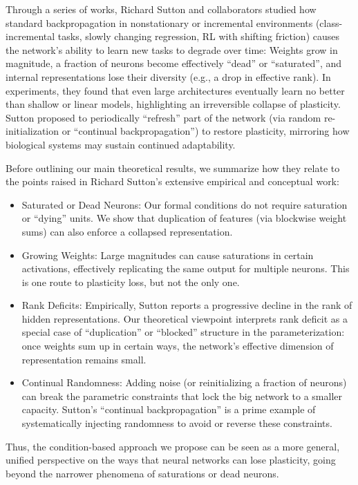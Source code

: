 \documentclass[11pt]{article}
\begin{document}
Through a series of works, Richard Sutton and collaborators studied how standard backpropagation in nonstationary or incremental environments (class-incremental tasks, slowly changing regression, RL with shifting friction) causes the network's ability to learn new tasks to degrade over time: Weights grow in magnitude, a fraction of neurons become effectively ``dead'' or ``saturated'', and internal representations lose their diversity (e.g., a drop in effective rank).
In experiments, they found that even large architectures eventually learn no better than shallow or linear models, highlighting an irreversible collapse of plasticity. Sutton proposed to periodically ``refresh'' part of the network (via random re-initialization or ``continual backpropagation'') to restore plasticity, mirroring how biological systems may sustain continued adaptability.

Before outlining our main theoretical results, we summarize how they relate to the points raised in Richard Sutton's extensive empirical and conceptual work:
\begin{itemize}
    \item Saturated or Dead Neurons: Our formal conditions do not require saturation or ``dying'' units. We show that duplication of features (via blockwise weight sums) can also enforce a collapsed representation.
    \item Growing Weights: Large magnitudes can cause saturations in certain activations, effectively replicating the same output for multiple neurons. This is one route to plasticity loss, but not the only one.
    \item Rank Deficits: Empirically, Sutton reports a progressive decline in the rank of hidden representations. Our theoretical viewpoint interprets rank deficit as a special case of ``duplication'' or ``blocked'' structure in the parameterization: once weights sum up in certain ways, the network's effective dimension of representation remains small.
    \item Continual Randomness: Adding noise (or reinitializing a fraction of neurons) can break the parametric constraints that lock the big network to a smaller capacity. Sutton's ``continual backpropagation'' is a prime example of systematically injecting randomness to avoid or reverse these constraints.
\end{itemize}
Thus, the condition-based approach we propose can be seen as a more general, unified perspective on the ways that neural networks can lose plasticity, going beyond the narrower phenomena of saturations or dead neurons.
\end{document}
